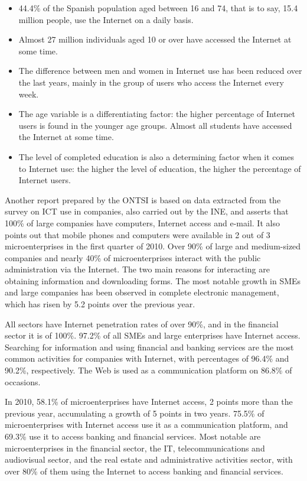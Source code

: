\begin{multicols}{2}
\begin{itemize}
\item 44.4\% of the Spanish population aged between 16 and 74, that is to say, 15.4 million people, use the Internet on a daily basis.
\item Almost 27 million individuals aged 10 or over have accessed the Internet at some time.
\item The difference between men and women in Internet use has been reduced over the last years, mainly in the group of users who access the Internet every week.
\item The age variable is a differentiating factor: the higher percentage of Internet users is found in the younger age groups. Almost all students have accessed the Internet at some time.
\item The level of completed education is also a determining factor when it comes to Internet use: the higher the level of education, the higher the percentage of Internet users.
\end{itemize}

Another report prepared by the ONTSI is based on data extracted from the survey on ICT use in companies, also carried out by the INE, and asserts that 100\% of large companies have computers, Internet access and e-mail. It also points out that mobile phones and computers were available in 2 out of 3 microenterprises in the first quarter of 2010. Over 90\% of large and medium-sized companies and nearly 40\% of microenterprises interact with the public administration via the Internet. The two main reasons for interacting are obtaining information and downloading forms. The most notable growth in SMEs and large companies has been observed in complete electronic management, which has risen by 5.2 points over the previous year.


All sectors have Internet penetration rates of over 90\%, and in the financial sector it is of 100\%. 97.2\% of all SMEs and large enterprises have Internet access. Searching for information and using financial and banking services are the most common activities for companies with Internet, with percentages of 96.4\% and 90.2\%, respectively. The Web is used as a communication platform on 86.8\% of occasions.

In 2010, 58.1\% of microenterprises have Internet access, 2 points more than the previous year, accumulating a growth of 5 points in two years. 75.5\% of microenterprises with Internet access use it as a communication platform, and 69.3\% use it to access banking and financial services. Most notable are microenterprises in the financial sector, the IT, telecommunications and audiovisual sector, and the real estate and administrative activities sector, with over 80\% of them using the Internet to access banking and financial services.


\end{multicols}
